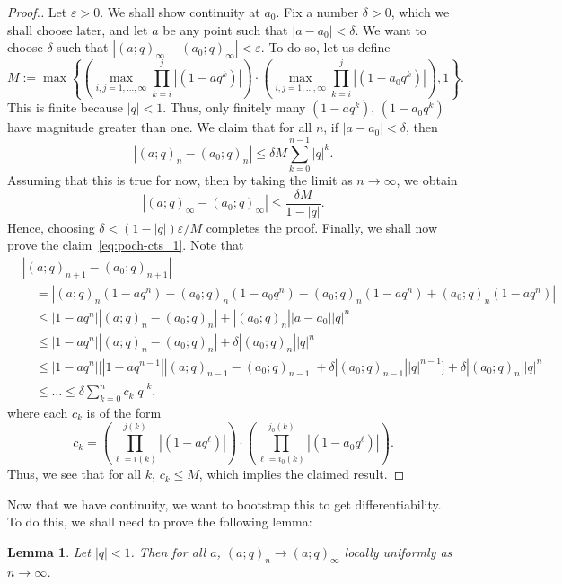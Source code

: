 \documentclass[11pt]{article}
\newtheorem{lemma}{Lemma}
\begin{document}
\begin{proof}[Proof.]
Let $\varepsilon > 0$. We shall show continuity at $a_0$. Fix a number $\delta > 0$, which we shall choose later, and let $a$ be any point such that $|a - a_0 | < \delta$. We want to choose $\delta$ such that $|(a;q)_\infty - (a_0;q)_\infty| < \varepsilon$.
To do so, let us define 
\[
    M := \max\left\{ \left(\max_{i,j = 1, \ldots, \infty} \prod_{k=i}^j| (1-aq^k)|\right) \cdot \left(\max_{i,j = 1, \ldots, \infty} \prod_{k=i}^j |(1-a_0q^k)|\right), 1 \right\}.
\]
This is finite because $|q| < 1$. Thus, only finitely many $(1-aq^k)$, $(1-a_0q^k)$ have magnitude greater than one. We claim that for all $n$, if $|a-a_0| < \delta$, then
\begin{equation} \label{eq:poch-cts_1}
    |(a;q)_n - (a_0;q)_n| \le \delta M \sum_{k=0}^{n-1} |q|^k.
\end{equation}
Assuming that this is true for now, then by taking the limit as $n \to \infty$, we obtain 
\[
    |(a;q)_\infty - (a_0;q)_\infty| \le \frac{\delta M }{1-|q|}. 
\]
Hence, choosing $\delta < (1 - |q|) \varepsilon / M$
completes the proof. Finally, we shall now prove the claim~\eqref{eq:poch-cts_1}. Note that  
\begin{align*}
    &|(a;q)_{n+1}- (a_0;q)_{n+1} | \\
    &\quad= |(a;q)_{n}(1-aq^n) - (a_0;q)_n (1-a_0q^n) - (a_0;q)_n(1-aq^n) + (a_0;q)_n(1-aq^n)| \\
    &\quad\le |1-aq^n||(a;q)_n - (a_0;q)_n| + |(a_0;q)_n||a-a_0||q|^n \\
    &\quad\le |1-aq^n||(a;q)_n - (a_0;q)_n| + \delta |(a_0;q)_n||q|^n \\
    &\quad\le |1-aq^n|\Big[ |1-aq^{n-1}| |(a;q)_{n-1} - (a_0;q)_{n-1}| + \delta |(a_0;q)_{n-1}| |q|^{n-1} \Big] + \delta |(a_0;q)_n||q|^n \\
    &\quad\le \ldots \le \delta \sum_{k=0}^n c_k |q|^k,
\end{align*}
where each $c_k$ is of the form
\[
    c_k = \left(\prod_{\ell=i(k)}^{j(k)}| (1-aq^\ell)|\right) \cdot \left(\prod_{\ell=i_0(k)}^{j_0(k)} |(1-a_0q^\ell)|\right).
\]
Thus, we see that for all $k$, $c_k \le M$, which implies the claimed result.
\end{proof}

Now that we have continuity, we want to bootstrap this to get differentiability. To do this, we shall need to prove the following lemma:

\begin{lemma} \label{lemma:locally-uniform}
Let $|q| < 1$. Then for all $a$, $(a;q)_n \to (a;q)_\infty$ locally uniformly as $n \to \infty$.
\end{lemma}
\end{document}
